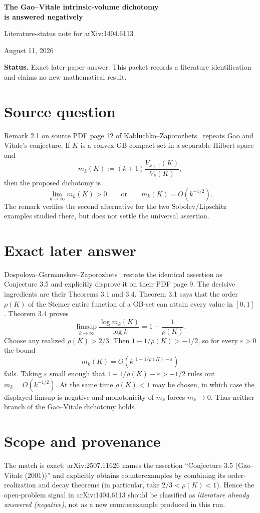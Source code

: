\documentclass[11pt]{article}
\begin{document}
\begin{center}
{\Large\bfseries The Gao--Vitale intrinsic-volume dichotomy\\is answered negatively}\par
\vspace{0.5em}
{\large Literature-status note for arXiv:1404.6113}\par
\vspace{0.5em}
August 11, 2026
\end{center}

\textbf{Status.} Exact later-paper answer.  This packet records a literature
identification and claims no new mathematical result.

\section*{Source question}
Remark 2.1 on source PDF page 12 of Kabluchko--Zaporozhets~\cite{KZ}
repeats Gao and Vitale's conjecture.  If $K$ is a convex GB-compact set in a
separable Hilbert space and
\[
 m_k(K):=(k+1)\frac{V_{k+1}(K)}{V_k(K)},
\]
then the proposed dichotomy is
\[
 \lim_{k\to\infty}m_k(K)>0
 \qquad\text{or}\qquad
 m_k(K)=O(k^{-1/2}).
\]
The remark verifies the second alternative for the two Sobolev/Lipschitz
examples studied there, but does not settle the universal assertion.

\section*{Exact later answer}
Dospolova--Germanskov--Zaporozhets~\cite{DGZ} restate the identical assertion
as Conjecture 3.5 and explicitly disprove it on their PDF page 9.  The decisive
ingredients are their Theorems 3.1 and 3.4.  Theorem 3.1 says that the order
$\rho(K)$ of the Steiner entire function of a GB-set can attain every value in
$[0,1]$.  Theorem 3.4 proves
\[
 \limsup_{k\to\infty}\frac{\log m_k(K)}{\log k}
 =1-\frac{1}{\rho(K)}.
\]
Choose any realized $\rho(K)>2/3$.  Then
$1-1/\rho(K)>-1/2$, so for every $\varepsilon>0$ the bound
\[
 m_k(K)=O\!\left(k^{,1-1/\rho(K)-\varepsilon}\right)
\]
fails.  Taking $\varepsilon$ small enough that
$1-1/\rho(K)-\varepsilon>-1/2$ rules out $m_k=O(k^{-1/2})$.
At the same time $\rho(K)<1$ may be chosen, in which case the displayed
limsup is negative and monotonicity of $m_k$ forces $m_k\to0$.  Thus neither
branch of the Gao--Vitale dichotomy holds.

\section*{Scope and provenance}
The match is exact: arXiv:2507.11626 names the assertion ``Conjecture 3.5
(Gao--Vitale (2001))'' and explicitly obtains counterexamples by combining its
order-realization and decay theorems (in particular, take $2/3<\rho(K)<1$).
Hence the open-problem signal in arXiv:1404.6113 should be
classified as \emph{literature already answered (negative)}, not as a new
counterexample produced in this run.
\end{document}
